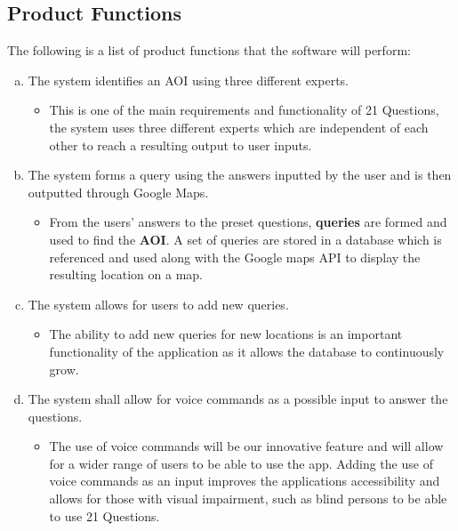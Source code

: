 \documentclass[titlepage]{article}
\begin{document}
		\subsection{Product Functions}
		\label{sub:product_functions}
		The following is a list of product functions that the software will perform:
		\begin{enumerate}[a)]
			\item The system identifies an AOI using three different experts.
			\begin{itemize}
				\item This is one of the main requirements and functionality of 21 Questions, the system uses three different experts which are independent of each other to reach a resulting output to user inputs.
			\end{itemize}
			\item The system forms a query using the answers inputted by the user and is then outputted through Google Maps.
			\begin{itemize}
				\item From the users' answers to the preset questions, \textbf{queries} are formed and used to find the \textbf{AOI}. A set of queries are stored in a database which is referenced and used along with the Google maps API to display the resulting location on a map.
			\end{itemize}
			\item The system allows for users to add new queries.
			\begin{itemize}
				\item The ability to add new queries for new locations is an important functionality of the application as it allows the database to continuously grow.
			\end{itemize}
			\item The system shall allow for voice commands as a possible input to answer the questions.
			\begin{itemize}
				\item The use of voice commands will be our innovative feature and will allow for a wider range of users to be able to use the app. Adding the use of voice commands as an input improves the applications accessibility and allows for those with visual impairment, such as blind persons to be able to use 21 Questions.
			\end{itemize} 
		\end{enumerate}
		
\end{document}
